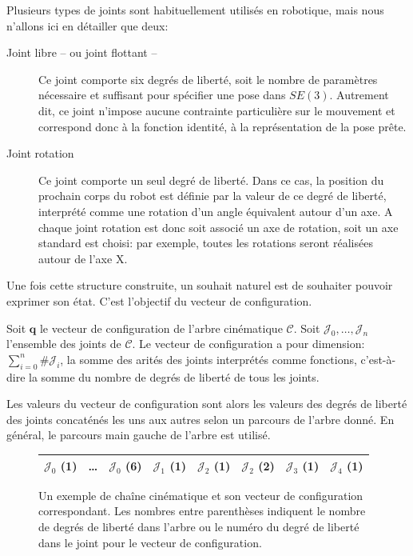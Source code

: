 Plusieurs types de joints sont habituellement utilisés en robotique,
mais nous n'allons ici en détailler que deux:
\begin{description}
\item[Joint libre -- ou joint flottant --] Ce joint comporte six
  degrés de liberté, soit le nombre de paramètres nécessaire et
  suffisant pour spécifier une pose dans $SE(3)$. Autrement dit, ce
  joint n'impose aucune contrainte particulière sur le mouvement et
  correspond donc à la fonction identité, à la représentation de la
  pose prête.
\item[Joint rotation] Ce joint comporte un seul degré de liberté. Dans
  ce cas, la position du prochain corps du robot est définie par la
  valeur de ce degré de liberté, interprété comme une rotation d'un
  angle équivalent autour d'un axe. A chaque joint rotation est donc
  soit associé un axe de rotation, soit un axe standard est choisi:
  par exemple, toutes les rotations seront réalisées autour de l'axe
  X.
\end{description}


Une fois cette structure construite, un souhait naturel est de
souhaiter pouvoir exprimer son état. C'est l'objectif du vecteur de
configuration.

\begin{mydef}
  Soit $\mathbf{q}$ le vecteur de configuration de l'arbre cinématique
  $\mathcal{C}$. Soit $\mathcal{J}_0, \dotsc, \mathcal{J}_n$
  l'ensemble des joints de $\mathcal{C}$. Le vecteur de configuration
  a pour dimension: $\sum_{i=0}^n \#\mathcal{J}_i$, la somme des arités
  des joints interprétés comme fonctions, c'est-à-dire la somme du
  nombre de degrés de liberté de tous les joints.


  Les valeurs du vecteur de configuration sont alors les valeurs des
  degrés de liberté des joints concaténés les uns aux autres selon un
  parcours de l'arbre donné. En général, le parcours main gauche de
  l'arbre est utilisé.
\end{mydef}

\begin{figure}[htbp!]
  \begin{center}

  \begin{tabular}{|ccc|c|cc|c|c|}
    \hline
    $\mathcal{J}_0$ (1) & \ldots & $\mathcal{J}_0$ (6)
    & $\mathcal{J}_1$ (1) & $\mathcal{J}_2$ (1) & $\mathcal{J}_2$ (2) & $\mathcal{J}_3$ (1) & $\mathcal{J}_4$ (1)\\
    \hline
  \end{tabular}
  \end{center}

  \caption{Un exemple de chaîne cinématique et son vecteur de
    configuration correspondant. Les nombres entre parenthèses
    indiquent le nombre de degrés de liberté dans l'arbre ou le numéro
    du degré de liberté dans le joint pour le vecteur de
    configuration.}
\end{figure}

